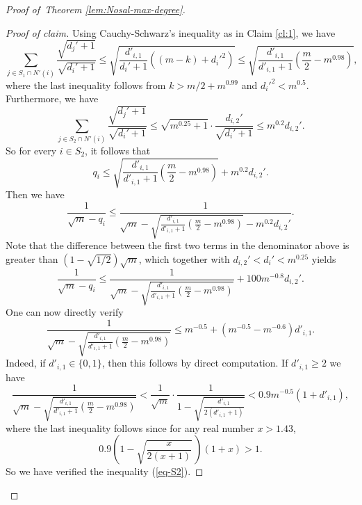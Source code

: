 \documentclass[11pt,a4paper]{article}
\theoremstyle{definition}
\theoremstyle{remark}
\newenvironment{poc}{\begin{proof}[Proof of claim]\renewcommand*{\qedsymbol}{$\blacksquare$}}{\end{proof}}
\begin{document}
\begin{proof}[Proof of~Theorem \ref{lem:Nosal-max-degree}]
\begin{poc}
Using Cauchy-Schwarz's inequality 
as in Claim \ref{cl:1}, we have
$$\sum_{j \in S_1 \cap N'(i)} \frac{\sqrt{d_j' + 1}}{\sqrt{d_i' + 1}} \leq \sqrt{ \frac{d'_{i,1}}{d_i' + 1} \left((m - k) + d_i'^2\right)} \leq 
\sqrt{ \frac{d'_{i,1}}{d'_{i,1} + 1} 
\left( \frac{m}{2} - m^{0.98} \right)},$$
where the last inequality follows from 
$k> m/2 + m^{0.99}$ and $d_i'^2 < m^{0.5}$. 
Furthermore, we have
$$\sum_{j \in S_2\cap N'(i)} \frac{\sqrt{d_j' + 1}}{\sqrt{d_i' + 1}} \leq \sqrt{m^{0.25} + 1} \cdot \frac{d_{i,2}'}{\sqrt{d_i' + 1}} \leq m^{0.2} d_{i,2}'.$$
So for every $i\in S_2$, it follows that  
\[ q_i \leq \sqrt{ \frac{d'_{i,1}}{d'_{i,1} + 1} 
\left( \frac{m}{2} - m^{0.98} \right)} + m^{0.2} d_{i,2}' . \]
Then we have
$$\frac{1}{\sqrt{m} - q_i} \leq \frac{1}{\sqrt{m} - \sqrt{\frac{d'_{i,1}}{d'_{i,1} + 1} 
\left( \frac{m}{2} - m^{0.98} \right)} - m^{0.2} d_{i,2}'}.$$ 
Note that the difference between the first two terms in the denominator above is greater than $(1 - \sqrt{1 / 2})\sqrt{m}$, 
which together with $d_{i,2}' < d_i' < m^{0.25}$ 
yields 
$$\frac{1}{\sqrt{m} - q_i} \leq 
\frac{1}{\sqrt{m} - \sqrt{\frac{d'_{i,1}}{d'_{i,1} + 1} 
\left( \frac{m}{2} - m^{0.98}\right)}} + 100m^{-0.8} d_{i,2}'.$$
One can now directly verify
$$\frac{1}{\sqrt{m} - \sqrt{\frac{d'_{i,1}}{d'_{i,1} + 1} 
\left( \frac{m}{2} - m^{0.98}\right)}} \leq 
m^{-0.5} + (m^{-0.5} - m^{-0.6}) d'_{i,1}.$$
Indeed, if $d'_{i,1} \in \{0, 1\}$, then this follows by direct computation. If $d'_{i,1} \geq 2$ we have
$$\frac{1}{\sqrt{m} - \sqrt{\frac{d'_{i,1}}{d'_{i,1} + 1} \left( \frac{m}{2} - m^{0.98} \right)}} 
<  \frac{1}{\sqrt{m}} \cdot \frac{1}{1 - \sqrt{\frac{d'_{i,1}}{2(d'_{i,1} + 1)}}} 
< 0.9 m^{-0.5} (1 + d'_{i,1}),$$
where the last inequality follows since for any real number $x> 1.43$, 
\[ 0.9\left( 1-\sqrt{\frac{x}{2(x+1)}}\, \right)(1+x) >1. \]  
So we have verified the inequality (\ref{eq-S2}).  
\end{poc}


\end{proof}
\end{document}
